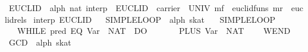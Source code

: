 \begin{isabellebody}
\endisatagproof
{\isafoldproof}%
%
\isadelimproof
\isanewline
%
\endisadelimproof
\isanewline
{}\isamarkupfalse%
\ EUCLID\ {}{}\ {}{}alph{}\ nat{}\ interp{}\ \ {}EUCLID\ {}\ {}carrier\ {}\ UNIV{}\ mf\ {}\ euclid{}funs{}\ mr\ {}\ euclid{}rels{}{}\isanewline
\isanewline
{}\isamarkupfalse%
\ interp\ EUCLID%
\isadelimproof
\ %
\endisadelimproof
%
\isatagproof
{}\isamarkupfalse%
%
\endisatagproof
{\isafoldproof}%
%
\isadelimproof
%
\endisadelimproof
\isanewline
\isanewline
{}\isamarkupfalse%
\ SIMPLE{}LOOP\ {}{}\ {}alph\ skat{}\ \isanewline
\ \ {}SIMPLE{}LOOP\ {}\isanewline
\ \ \ WHILE\ {}{}pred\ {}EQ\ {}Var\ {}{}\ {}NAT\ {}{}{}{}\ DO\isanewline
\ \ \ \ \ {}\ {}{}\ PLUS\ {}Var\ {}{}\ {}NAT\ {}{}\isanewline
\ \ \ WEND{}\isanewline
\isanewline
{}\isamarkupfalse%
\ GCD\ {}{}\ {}alph\ skat{}\ \isanewline

\end{isabellebody}
